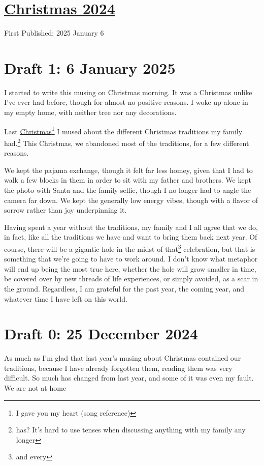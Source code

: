 \documentclass[12pt]{article}[titlepage]
\newcommand{\1}{\={a}}
\newcommand{\2}{\={e}}
\newcommand{\3}{\={\i}}
\newcommand{\4}{\=o}
\newcommand{\5}{\=u}
\newcommand{\6}{\={A}}
\renewcommand{\,}{\textsuperscript{,}}
\begin{document}
\doublespacing
\section{\href{christmas-2024.html}{Christmas 2024}}
First Published: 2025 January 6
\section{Draft 1: 6 January 2025}

I started to write this musing on Christmas morning.  
It was a Christmas unlike I've ever had before, though for almost no positive reasons.  
I woke up alone in my empty home, with neither tree nor any decorations.

Last \href{christmas-2023.html}{Christmas}\footnote{I gave you my heart (song reference)} I mused about the different Christmas traditions my family had.\footnote{has? It's hard to use tenses when discussing anything with my family any longer}  
This Christmas, we abandoned most of the traditions, for a few different reasons.

We kept the pajama exchange, though it felt far less homey, given that I had to walk a few blocks in them in order to sit with my father and brothers.  
We kept the photo with Santa and the family selfie, though I no longer had to angle the camera far down.  
We kept the generally low energy vibes, though with a flavor of sorrow rather than joy underpinning it.

Having spent a year without the traditions, my family and I all agree that we do, in fact, like all the traditions we have and want to bring them back next year.  
Of course, there will be a gigantic hole in the midst of that\footnote{and every} celebration, but that is something that we're going to have to work around.  
I don't know what metaphor will end up being the most true here, whether the hole will grow smaller in time, be covered over by new threads of life experiences, or simply avoided, as a scar in the ground.  
Regardless, I am grateful for the past year, the coming year, and whatever time I have left on this world.  


\section{Draft 0: 25 December 2024}  

As much as I'm glad that last year's musing about Christmas contained our traditions, because I have already forgotten them, reading them was very difficult.  
So much has changed from last year, and some of it was even my fault.  
We are not at home  
\end{document}
